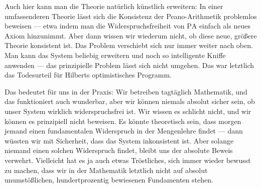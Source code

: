 \begin{ai-global-state-checkpoint-invisible-content}
\end{ai-global-state-checkpoint-invisible-content}

\begin{spoken-clean}[01:03:50 - 01:06:50]
Auch hier kann man die Theorie natürlich künstlich erweitern: In einer umfassenderen Theorie lässt sich die Konsistenz der Peano-Arithmetik problemlos beweisen --- etwa indem man die Widerspruchsfreiheit von $\text{PA}$ einfach als neues Axiom hinzunimmt. Aber dann wissen wir wiederum nicht, ob diese neue, größere Theorie konsistent ist. Das Problem verschiebt sich nur immer weiter nach oben. Man kann das System beliebig erweitern und noch so intelligente Kniffe anwenden --- das prinzipielle Problem lässt sich nicht umgehen. Das war letztlich das Todesurteil für Hilberts optimistisches Programm.

Das bedeutet für uns in der Praxis: Wir betreiben tagtäglich Mathematik, und das funktioniert auch wunderbar, aber wir können niemals absolut sicher sein, ob unser System wirklich widerspruchsfrei ist. Wir wissen es schlicht nicht, und wir können es prinzipiell nicht beweisen. Es könnte theoretisch sein, dass morgen jemand einen fundamentalen Widerspruch in der Mengenlehre findet --- dann wüssten wir mit Sicherheit, dass das System inkonsistent ist. Aber solange niemand einen solchen Widerspruch findet, bleibt uns der absolute Beweis verwehrt. Vielleicht hat es ja auch etwas Tröstliches, sich immer wieder bewusst zu machen, dass wir in der Mathematik letztlich nicht auf absolut unumstößlichen, hundertprozentig bewiesenen Fundamenten stehen.
\end{spoken-clean}

